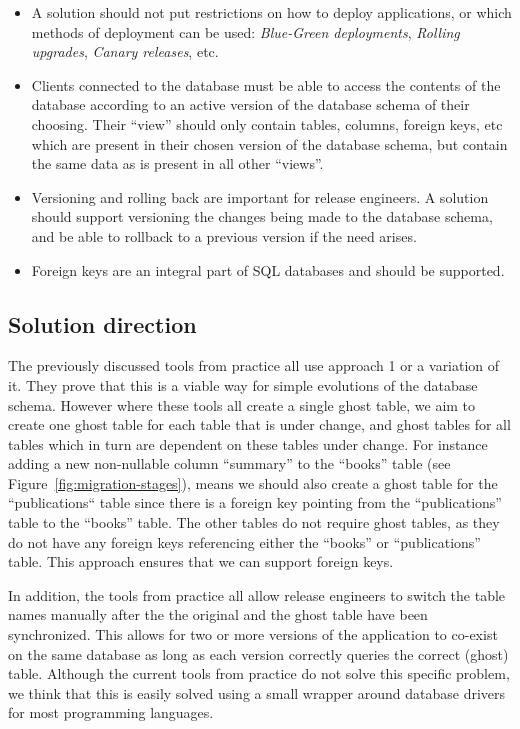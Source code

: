 \documentclass[conference]{IEEEtran}
\begin{document}
\begin{itemize}
  \item{A solution should not put restrictions on how to deploy applications, or which methods of deployment can be used: \textit{Blue-Green deployments}, \textit{Rolling upgrades}, \textit{Canary releases}, etc.}
  \item{Clients connected to the database must be able to access the contents of the database according to an active version of the database schema of their choosing. Their ``view'' should only contain tables, columns, foreign keys, etc which are present in their chosen version of the database schema, but contain the same data as is present in all other ``views''.}
  \item{Versioning and rolling back are important for release engineers. A solution should support versioning the changes being made to the database schema, and be able to rollback to a previous version if the need arises.}
  \item{Foreign keys are an integral part of SQL databases and should be supported.}
\end{itemize}

\subsection{Solution direction}

The previously discussed tools from practice all use approach 1 or a variation of it. They prove that this is a viable way for simple evolutions of the database schema. However where these tools all create a single ghost table, we aim to create one ghost table for each table that is under change, and ghost tables for all tables which in turn are dependent on these tables under change. For instance adding a new non-nullable column ``summary'' to the ``books'' table (see Figure~\ref{fig:migration-stages}), means we should also create a ghost table for the ``publications`` table since there is a foreign key pointing from the ``publications'' table to the ``books'' table. The other tables do not require ghost tables, as they do not have any foreign keys referencing either the ``books'' or ``publications'' table. This approach ensures that we can support foreign keys.

In addition, the tools from practice all allow release engineers to switch the table names manually after the the original and the ghost table have been synchronized. This allows for two or more versions of the application to co-exist on the same database as long as each version correctly queries the correct (ghost) table. Although the current tools from practice do not solve this specific problem, we think that this is easily solved using a small wrapper around database drivers for most programming languages.
\end{document}
